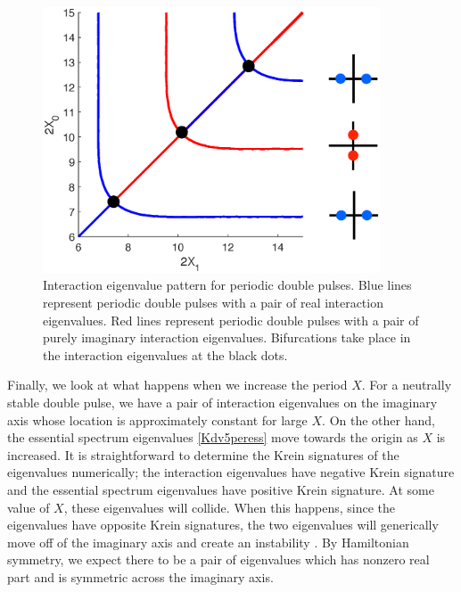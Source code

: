 \documentclass[11pt,reqno]{amsart}
\theoremstyle{plain}
\theoremstyle{definition}
\theoremstyle{remark}
\begin{document}
\begin{figure}
\begin{center}
\includegraphics[width=10cm]{images/2periodiceigpattern.eps}
\end{center}
\caption[Interaction eigenvalue pattern for periodic double pulses in KdV5]{Interaction eigenvalue pattern for periodic double pulses. Blue lines represent periodic double pulses with a pair of real interaction eigenvalues. Red lines represent periodic double pulses with a pair of purely imaginary interaction eigenvalues. Bifurcations take place in the interaction eigenvalues at the black dots.}
\label{fig:2periodiceigpattern}
\end{figure}

Finally, we look at what happens when we increase the period $X$. For a neutrally stable double pulse, we have a pair of interaction eigenvalues on the imaginary axis whose location is approximately constant for large $X$. On the other hand, the essential spectrum eigenvalues \cref{Kdv5peress} move towards the origin as $X$ is increased. It is straightforward to determine the Krein signatures of the eigenvalues numerically; the interaction eigenvalues have negative Krein signature and the essential spectrum eigenvalues have positive Krein signature. At some value of $X$, these eigenvalues will collide. When this happens, since the eigenvalues have opposite Krein signatures, the two eigenvalues will generically move off of the imaginary axis and create an instability \cite[Chapter 7.1]{Kapitula2013}. By Hamiltonian symmetry, we expect there to be a pair of eigenvalues which has nonzero real part and is symmetric across the imaginary axis.
\end{document}
